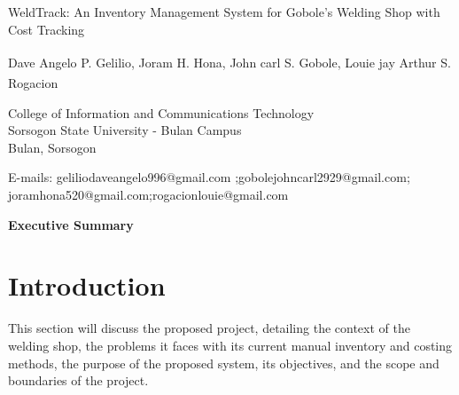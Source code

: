 \documentclass[12pt, letterpaper]{article}
\newcommand{\invertedtitle}[1]{
    \begin{center}
        \titlefont\fontsize{17}{20.4}\selectfont\bfseries
        #1
    \end{center}
}
\begin{document}

\invertedtitle{
    WeldTrack: An Inventory Management System for Gobole's Welding Shop with Cost Tracking 
}

\vspace{1.5em}

\begin{center}
    {\fontsize{12}{14.4}\selectfont
    Dave Angelo P. Gelilio\textsuperscript{}, Joram H. Hona\textsuperscript{}, John carl S. Gobole\textsuperscript{}, Louie jay Arthur S. Rogacion\textsuperscript{} \par}
    
    \vspace{1em}
    
    {\fontsize{12}{14.4}\selectfont
    College of Information and Communications Technology \\
    Sorsogon State University - Bulan Campus \\
    Bulan, Sorsogon \par}
    
    \vspace{1.5em}
    
    {\fontsize{12}{14.4}\selectfont
    E-mails: geliliodaveangelo996@gmail.com ;gobolejohncarl2929@gmail.com; joramhona520@gmail.com;rogacionlouie@gmail.com\par}
\end{center}

\vspace{2.5em} %

\begin{center}
    {\titlefont\fontsize{12}{14.4}\selectfont\bfseries Executive Summary}
\end{center}
\newpage %

\section{Introduction}
 \hspace*{2em}This section will discuss the proposed project, detailing the context of the welding shop, the problems it faces with its current manual inventory and costing methods, the purpose of the proposed system, its objectives, and the scope and boundaries of the project.
\end{document}
